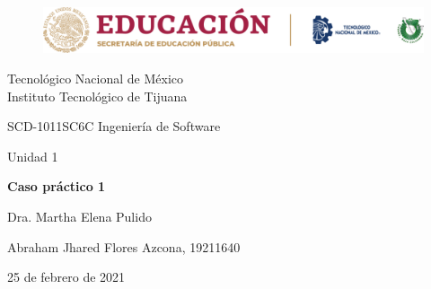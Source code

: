 \documentclass[stu, 12pt, letterpaper, donotrepeattitle, floatsintext, natbib]{apa7}
\begin{document}
    \begin{titlepage}
        \begin{figure}[ht]
            \centering
            \includegraphics[width=15cm]{logosITT.png}
        \end{figure}
        \centering
        {\Large Tecnológico Nacional de México\\Instituto Tecnológico de Tijuana\par}
        \vspace{1cm}
        {\Large SCD-1011SC6C Ingeniería de Software\par}
        \vspace{1cm}
        {\Large Unidad 1\par}
        \vspace{2cm}
        {\Large\bfseries Caso práctico 1\par}
        \vspace{2cm}
        {\large Dra. Martha Elena Pulido\par}
        \vfill
            {\large Abraham Jhared Flores Azcona, 19211640\par}
        \vfill
        {\large 25 de febrero de 2021}
    \end{titlepage}

\renewcommand\contentsname{Contenido}
\tableofcontents

\newpage
\end{document}
